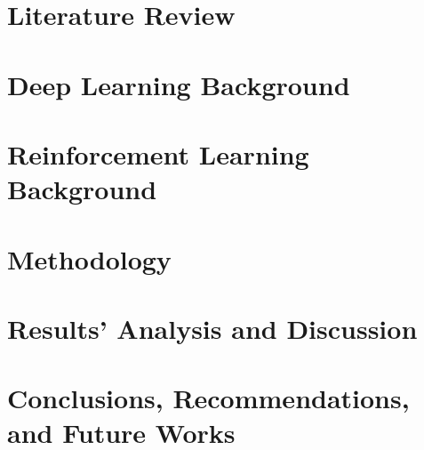 \documentclass[tg, eng, dv]{ita}    %
\begin{document}
\chapter{Literature Review}\label{ch:soccer3d}


\chapter{Deep Learning Background}\label{ch:deeplearning}


\chapter{Reinforcement Learning Background}\label{ch:deeplearning}


\chapter{Methodology}\label{ch:methodology}


\chapter{Results' Analysis and Discussion}\label{ch:results}


\chapter{Conclusions, Recommendations, and Future Works}\label{ch:conclusion}


\renewcommand\bibname{\itareferencesnamebabel} %


%

%

\end{document}
